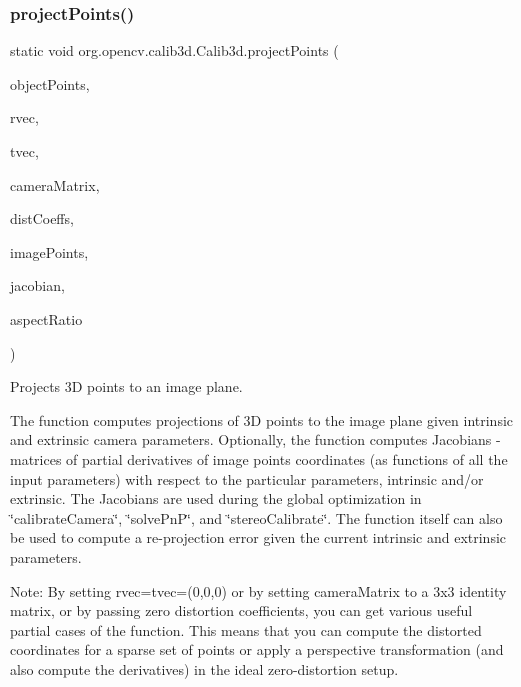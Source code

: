 \subsubsection{\texorpdfstring{project\+Points()}{projectPoints()}\hspace{0.1cm}{\footnotesize\ttfamily [1/2]}}
{\footnotesize\ttfamily static void org.\+opencv.\+calib3d.\+Calib3d.\+project\+Points (\begin{DoxyParamCaption}\item[{\mbox{\hyperlink{classorg_1_1opencv_1_1core_1_1_mat_of_point3f}{Mat\+Of\+Point3f}}}]{object\+Points,  }\item[{\mbox{\hyperlink{classorg_1_1opencv_1_1core_1_1_mat}{Mat}}}]{rvec,  }\item[{\mbox{\hyperlink{classorg_1_1opencv_1_1core_1_1_mat}{Mat}}}]{tvec,  }\item[{\mbox{\hyperlink{classorg_1_1opencv_1_1core_1_1_mat}{Mat}}}]{camera\+Matrix,  }\item[{\mbox{\hyperlink{classorg_1_1opencv_1_1core_1_1_mat_of_double}{Mat\+Of\+Double}}}]{dist\+Coeffs,  }\item[{\mbox{\hyperlink{classorg_1_1opencv_1_1core_1_1_mat_of_point2f}{Mat\+Of\+Point2f}}}]{image\+Points,  }\item[{\mbox{\hyperlink{classorg_1_1opencv_1_1core_1_1_mat}{Mat}}}]{jacobian,  }\item[{double}]{aspect\+Ratio }\end{DoxyParamCaption})\hspace{0.3cm}{\ttfamily [static]}}

Projects 3D points to an image plane.

The function computes projections of 3D points to the image plane given intrinsic and extrinsic camera parameters. Optionally, the function computes Jacobians -\/ matrices of partial derivatives of image points coordinates (as functions of all the input parameters) with respect to the particular parameters, intrinsic and/or extrinsic. The Jacobians are used during the global optimization in \char`\"{}calibrate\+Camera\char`\"{}, \char`\"{}solve\+Pn\+P\char`\"{}, and \char`\"{}stereo\+Calibrate\char`\"{}. The function itself can also be used to compute a re-\/projection error given the current intrinsic and extrinsic parameters.

Note\+: By setting {\ttfamily rvec=tvec=(0,0,0)} or by setting {\ttfamily camera\+Matrix} to a 3x3 identity matrix, or by passing zero distortion coefficients, you can get various useful partial cases of the function. This means that you can compute the distorted coordinates for a sparse set of points or apply a perspective transformation (and also compute the derivatives) in the ideal zero-\/distortion setup.


